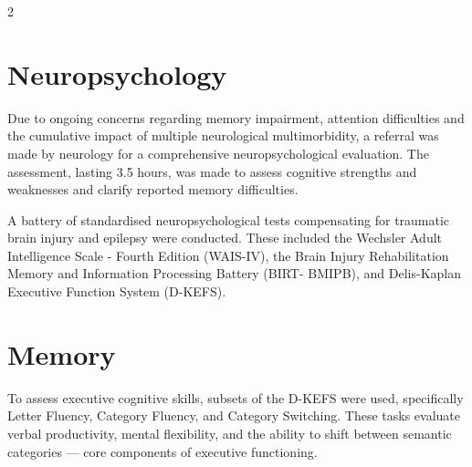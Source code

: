\documentclass{article}
\begin{document}
\begin{multicols}{2}
\section*{Neuropsychology}
Due to ongoing concerns regarding memory impairment, attention difficulties and the cumulative impact of multiple neurological multimorbidity, a referral was made by neurology for a comprehensive neuropsychological evaluation. The assessment, lasting 3.5 hours, was made to assess cognitive strengths and weaknesses and clarify reported memory difficulties.

A battery of standardised neuropsychological tests compensating for traumatic brain injury and epilepsy were conducted. These included the Wechsler Adult Intelligence Scale - Fourth Edition (WAIS-IV), the Brain Injury Rehabilitation Memory and Information Processing Battery (BIRT- BMIPB), and Delis-Kaplan Executive Function System (D-KEFS).

\section*{Memory}
To assess executive cognitive skills, subsets of the D-KEFS were used, specifically Letter Fluency, Category Fluency, and Category Switching. These tasks evaluate verbal productivity, mental flexibility, and the ability to shift between semantic categories — core components of executive functioning.

\end{multicols}
\end{document}
